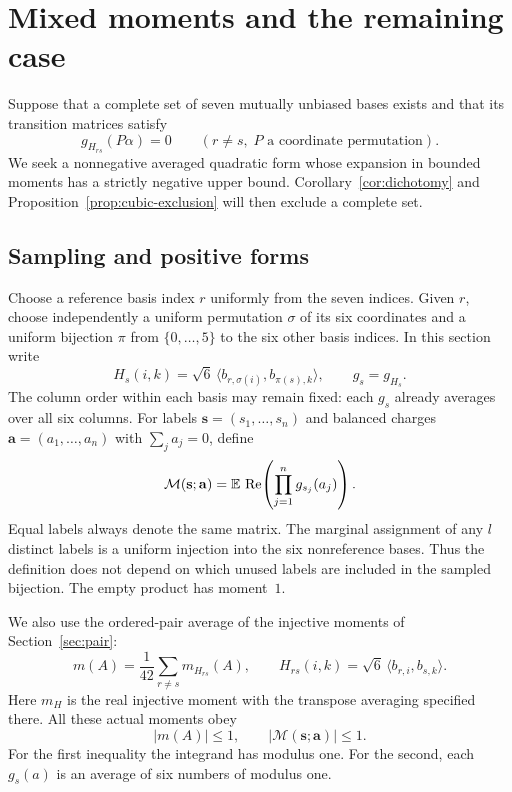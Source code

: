 \section{Mixed moments and the remaining case}\label{sec:mixed}

Suppose that a complete set of seven mutually unbiased bases exists and that
its transition matrices satisfy
\begin{equation}\label{eq:all-M}
 g_{H_{rs}}(P\alpha)=0
 \qquad(r\ne s,\;P\text{ a coordinate permutation}).
\end{equation}
We seek a nonnegative averaged quadratic form whose expansion in bounded
moments has a strictly negative upper bound. Corollary~\ref{cor:dichotomy} and
Proposition~\ref{prop:cubic-exclusion} will then exclude a complete set.

\subsection{Sampling and positive forms}

Choose a reference basis index $r$ uniformly from the seven indices. Given
$r$, choose independently a uniform permutation $\sigma$ of its six
coordinates and a uniform bijection $\pi$ from $\{0,\ldots,5\}$ to the
six other basis indices. In this section write
\[
 H_s(i,k)=\sqrt6\,\langle b_{r,\sigma(i)},b_{\pi(s),k}\rangle,
 \qquad g_s=g_{H_s}.
\]
The column order within each basis may remain fixed: each $g_s$ already
averages over all six columns.
For labels $\mathbf s=(s_1,\ldots,s_n)$ and balanced charges
$\mathbf a=(a_1,\ldots,a_n)$ with $\sum_j a_j=0$, define
\begin{equation}\label{eq:mixed-moment}
 \mathcal M(\mathbf s;\mathbf a)
   =\mathbb E\,\operatorname{Re}\!\left(\prod_{j=1}^n g_{s_j}(a_j)\right).
\end{equation}
Equal labels always denote the same matrix. The marginal assignment of any
$l$ distinct labels is a uniform injection into the six nonreference
bases. Thus the definition does not depend on which unused labels are
included in the sampled bijection. The empty product has moment~$1$.

We also use the ordered-pair average of the injective moments of
Section~\ref{sec:pair}:
\begin{equation}\label{eq:average-pair-moment}
 m(A)=\frac1{42}\sum_{r\ne s}m_{H_{rs}}(A),
 \qquad
 H_{rs}(i,k)=\sqrt6\,\langle b_{r,i},b_{s,k}\rangle.
\end{equation}
Here $m_H$ is the real injective moment with the transpose averaging
specified there. All these actual moments obey
\begin{equation}\label{eq:moment-bounds}
 |m(A)|\le1,\qquad |\mathcal M(\mathbf s;\mathbf a)|\le1.
\end{equation}
For the first inequality the integrand has modulus one. For the second,
each $g_s(a)$ is an average of six numbers of modulus one.

